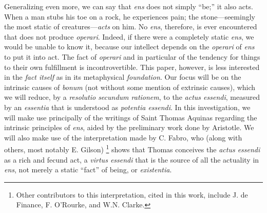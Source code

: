 Generalizing even more, we can say that \emph{ens} does not simply “be;” it also acts. When a man stubs his toe on a rock, he experiences pain; the stone---seemingly the most static of creatures---\emph{acts} on him. No \emph{ens}, therefore, is ever encountered that does not produce \emph{operari}. Indeed, if there were a completely static \emph{ens}, we would be unable to know it, because our intellect depends on the \emph{operari} of \emph{ens} to put it into act. The fact of \emph{operari} and in particular of the tendency for things to their own fulfillment is incontrovertible. This paper, however, is less interested in the \emph{fact itself} as in its metaphysical \emph{foundation}. Our focus will be on the intrinsic causes of \emph{bonum} (not without some mention of extrinsic causes), which we will reduce, by a \emph{resolutio secundum rationem}, to the \emph{actus essendi}, measured by an \emph{essentia} that is understood as \emph{potentia essendi}. In this investigation, we will make use principally of the writings of Saint Thomas Aquinas regarding the intrinsic principles of \emph{ens}, aided by the preliminary work done by Aristotle. We will also make use of the interpretation made by C. Fabro, who (along with others, most notably E. Gilson)%
%
\footnote{Other contributors to this interpretation, cited in this work, include J. de Finance, F. O’Rourke, and W.N. Clarke.}
%
shows that Thomas conceives the \emph{actus essendi} as a rich and fecund act, a \emph{virtus essendi} that is the source of all the actuality in \emph{ens}, not merely a static “fact” of being, or \emph{existentia}.

